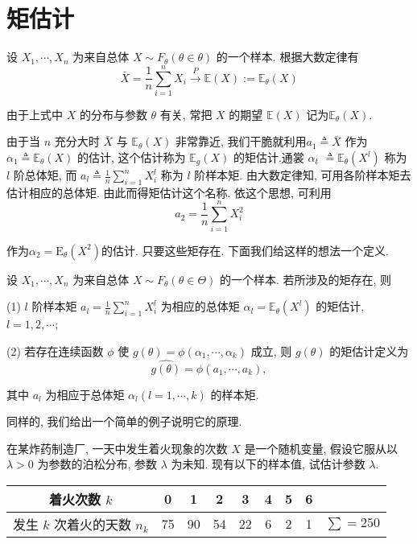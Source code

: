 \section{矩估计}

设 $X_1, \cdots, X_n$ 为来自总体 $X \sim F_\theta(\theta \in \theta)$ 的一个样本. 根据大数定律有
$$\bar{X}=\frac{1}{n} \sum_{i=1}^n X_i \stackrel{P}{\longrightarrow} \mathbb{E}(X) := \mathbb{E}_\theta(X)$$

由于上式中 $X$ 的分布与参数 $\theta$ 有关, 常把 $X$ 的期望 $\mathbb{E}(X)$ 记为$\mathbb{E}_\theta(X)$. 

由于当 $n$ 充分大时 $\bar{X}$ 与 $\mathbb{E}_\theta(X)$ 非常靠近, 我们干脆就利用$a_1 \triangleq \bar{X}$ 作为 $\alpha_1 \triangleq \mathbb{E}_\theta(X)$ 的估计, 这个估计称为 $\mathbb{E}_g(X)$ 的矩估计.通裳 $\alpha_t$ $\triangleq \mathbb{E}_\theta\left(X^l\right)$ 称为 $l$ 阶总体矩, 而 $a_l \triangleq \frac{1}{n} \sum_{i=1}^n X_i^l$ 称为 $l$ 阶样本矩. 由大数定律知, 可用各阶样本矩去估计相应的总体矩. 由此而得矩估计这个名称. 依这个思想, 可利用
$$
a_2=\frac{1}{n} \sum_{i=1}^n X_i^2
$$

作为$\alpha_2 =\mathrm E_\theta ({X^2})$的估计. 只要这些矩存在. 下面我们给这样的想法一个定义. 

\begin{definition}
    设 $X_1, \cdots, X_n$ 为来自总体 $X \sim F_\theta(\theta \in \Theta)$ 的一个样本. 若所涉及的矩存在, 则

(1) $l$ 阶样本矩 $a_l=\frac{1}{n} \sum_{i=1}^n X_i^l$ 为相应的总体矩 $\alpha_l=\mathbb{E}_\theta\left(X^l\right)$ 的矩估计, $l=1,2, \cdots$;


(2) 若存在连续函数 $\phi$ 使 $g(\theta)=\phi\left(\alpha_1, \cdots, \alpha_k\right)$ 成立, 则 $g(\theta)$ 的矩估计定义为
$$
\widehat{g(\theta)}=\phi\left(a_1, \cdots, a_k\right),
$$

其中 $a_l$ 为相应于总体矩 $\alpha_l(l=1, \cdots, k)$ 的样本矩.
\end{definition}

同样的, 我们给出一个简单的例子说明它的原理. 
\begin{example}
    在某炸药制造厂, 一天中发生着火现象的次数 $X$ 是一个随机变量, 假设它服从以 $\lambda>0$ 为参数的泊松分布, 参数 $\lambda$ 为未知. 现有以下的样本值, 试估计参数 $\lambda$.

\begin{tabular}{c|ccccccc|c} 
    着火次数 $k$ & 0 & 1 & 2 & 3 & 4 & 5 & 6 & \\
    \hline 发生 $k$ 次着火的天数 $n_k$ & 75 & 90 & 54 & 22 & 6 & 2 & 1 & $\sum=250$
    \end{tabular}
\end{example}

